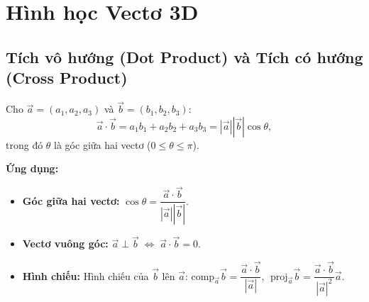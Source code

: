 \documentclass[12pt,a4paper]{article}
\begin{document}
\section{Hình học Vectơ 3D}

\subsection{Tích vô hướng (Dot Product) và Tích có hướng (Cross Product)}

\begin{congthuc}[title={Tích vô hướng (Dot Product)}]
  Cho $\vec{a} = (a_1, a_2, a_3)$ và $\vec{b} = (b_1, b_2, b_3)$:
  \[
    \vec{a} \cdot \vec{b} = a_1 b_1 + a_2 b_2 + a_3 b_3 = |\vec{a}||\vec{b}|\cos\theta,
  \]
  trong đó $\theta$ là góc giữa hai vectơ ($0 \le \theta \le \pi$).

  \textbf{Ứng dụng:}
  \begin{itemize}
    \item \textbf{Góc giữa hai vectơ:} $\cos\theta = \dfrac{\vec{a}\cdot\vec{b}}{|\vec{a}||\vec{b}|}$.
    \item \textbf{Vectơ vuông góc:} $\vec{a} \perp \vec{b} \;\Leftrightarrow\; \vec{a}\cdot\vec{b} = 0$.
    \item \textbf{Hình chiếu:} Hình chiếu của $\vec{b}$ lên $\vec{a}$: $\text{comp}_{\vec{a}} \vec{b} = \dfrac{\vec{a}\cdot\vec{b}}{|\vec{a}|}$, $\;\text{proj}_{\vec{a}}\vec{b} = \dfrac{\vec{a}\cdot\vec{b}}{|\vec{a}|^2}\vec{a}$.
  \end{itemize}
\end{congthuc}
\end{document}
